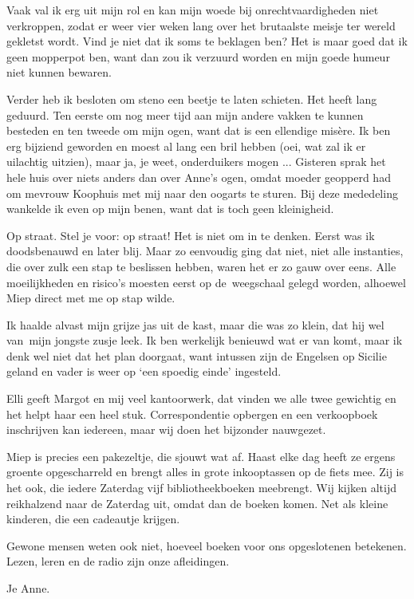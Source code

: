 \documentclass{book}
\begin{document}
Vaak val ik erg uit mijn rol en kan mijn woede bij onrechtvaardigheden niet
verkroppen, zodat er weer vier weken lang over het brutaalste meisje ter wereld
gekletst wordt. Vind je niet dat ik soms te beklagen ben? Het is maar goed dat
ik geen mopperpot ben, want dan zou ik verzuurd worden en mijn goede humeur niet
kunnen bewaren.

Verder heb ik besloten om steno een beetje te laten schieten. Het heeft lang
geduurd. Ten eerste om nog meer tijd aan mijn andere vakken te kunnen besteden
en ten tweede om mijn ogen, want dat is een ellendige misère. Ik ben erg
bijziend geworden en moest al lang een bril hebben (oei, wat zal ik er uilachtig
uitzien), maar ja, je weet, onderduikers mogen ... Gisteren sprak het hele huis
over niets anders dan over Anne's ogen, omdat moeder geopperd had om mevrouw
Koophuis met mij naar den oogarts te sturen. Bij deze mededeling wankelde ik
even op mijn benen, want dat is toch geen kleinigheid.

Op straat. Stel je voor: op straat! Het is niet om in te denken. Eerst was ik
doodsbenauwd en later blij. Maar zo eenvoudig ging dat niet, niet alle
instanties, die over zulk een stap te beslissen hebben, waren het er zo gauw
over eens. Alle moeilijkheden en risico's moesten eerst op de~weegschaal gelegd
worden, alhoewel Miep direct met me op stap wilde.

Ik haalde alvast mijn grijze jas uit de kast, maar die was zo klein, dat hij wel
van~mijn jongste zusje leek. Ik ben werkelijk benieuwd wat er van komt, maar ik
denk wel niet dat het plan doorgaat, want intussen zijn de Engelsen op Sicilie
geland en vader is weer op `een spoedig einde' ingesteld.

Elli geeft Margot en mij veel kantoorwerk, dat vinden we alle twee gewichtig en
het helpt haar een heel stuk. Correspondentie opbergen en een verkoopboek
inschrijven kan iedereen, maar wij doen het bijzonder nauwgezet.

Miep is precies een pakezeltje, die sjouwt wat af. Haast elke dag heeft ze
ergens groente opgescharreld en brengt alles in grote inkooptassen op de fiets
mee. Zij is het ook, die iedere Zaterdag vijf bibliotheekboeken meebrengt. Wij
kijken altijd reikhalzend naar de Zaterdag uit, omdat dan de boeken komen. Net
als kleine kinderen, die een cadeautje krijgen.

Gewone mensen weten ook niet, hoeveel boeken voor ons opgeslotenen betekenen.
Lezen, leren en de radio zijn onze afleidingen.

Je Anne.
\end{document}
